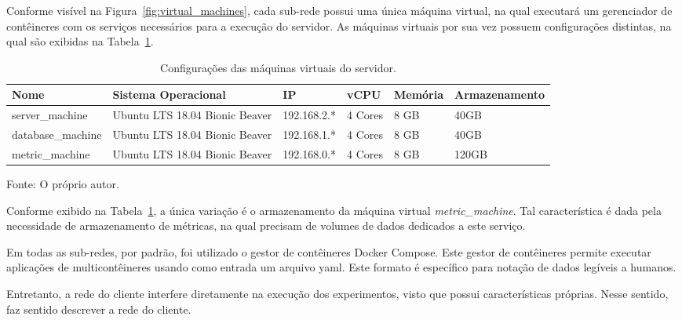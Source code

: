 Conforme visível na Figura~\ref{fig:virtual_machines}, cada sub-rede possui uma única máquina virtual, na qual executará um gerenciador de contêineres com os serviços necessários para a execução do servidor.
%
As máquinas virtuais por sua vez possuem configurações distintas, na qual são exibidas na Tabela~\ref{tab:configuracao_das_maquinas}.



\begin{table}[htb!]
\centering
\begin{adjustbox}{max width=\textwidth}
\caption{Configurações das máquinas virtuais do servidor.}
\label{tab:configuracao_das_maquinas}
\begin{tabular}{|l|l|l|l|l|l|}
\hline
Nome              & Sistema Operacional            & IP          & vCPU    & Memória & Armazenamento \\ \hline
server\_machine   & Ubuntu LTS 18.04 Bionic Beaver & 192.168.2.* & 4 Cores & 8 GB    & 40GB          \\ \hline
database\_machine & Ubuntu LTS 18.04 Bionic Beaver & 192.168.1.* & 4 Cores & 8 GB    & 40GB          \\ \hline
metric\_machine   & Ubuntu LTS 18.04 Bionic Beaver & 192.168.0.* & 4 Cores & 8 GB    & 120GB         \\ \hline
\end{tabular}
\end{adjustbox}

Fonte: O próprio autor.
\end{table}



Conforme exibido na Tabela~\ref{tab:configuracao_das_maquinas}, a única variação é o armazenamento da máquina virtual \textit{metric\_machine}.
%
Tal característica é dada pela necessidade de armazenamento de métricas, na qual precisam de volumes de dados dedicados a este serviço.



Em todas as sub-redes, por padrão, foi utilizado o gestor de contêineres Docker Compose.
%
Este gestor de contêineres permite executar aplicações de multicontêineres usando como entrada um arquivo \ac{yaml}.
%
Este formato é específico para notação de dados legíveis a humanos.



Entretanto, a rede do cliente interfere diretamente na execução dos experimentos, visto que possui características próprias.
%
Nesse sentido, faz sentido descrever a rede do cliente.

